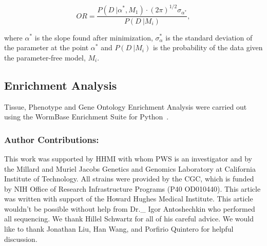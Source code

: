 \documentclass[10pt, onecolumn]{article}
\begin{document}
\begin{equation}
  OR = \frac{
  P(D~|\alpha^*, M_1)\cdot (2\pi)^{1/2}\sigma_{\alpha^*} %
  }{P(D~| M_i)}, %
\end{equation}

where $\alpha^*$ is the slope found after minimization, $\sigma_\alpha^*$ is the
standard deviation of the parameter at the point $\alpha^*$ and $P(D~|M_i)$ is the
probability of the data given the parameter-free model, $M_i$.

\subsection*{Enrichment Analysis}
Tissue, Phenotype and Gene Ontology Enrichment Analysis were carried out using
the WormBase Enrichment Suite for Python~\cite{Angeles-Albores2016b,Angeles-Albores2016}.



\subsubsection*{Author Contributions:}
This work was supported by HHMI with whom PWS is an investigator
and by the Millard and Muriel Jacobs Genetics and Genomics Laboratory at
California Institute of Technology.
All strains were provided by the CGC, which is funded by NIH Office of Research
Infrastructure Programs (P40 OD010440).
This article was written with support of the Howard Hughes Medical Institute.
This article wouldn't be possible without help from Dr.\_ Igor Antoshechkin who
performed all sequencing.
We thank Hillel Schwartz for all of his careful advice.
We would like to thank Jonathan Liu, Han Wang, and Porfirio Quintero for helpful
discussion.


\nolinenumbers{}




\end{document}
